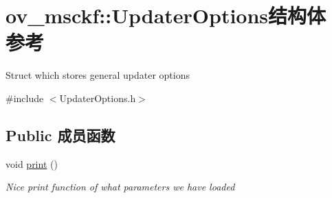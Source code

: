 \hypertarget{structov__msckf_1_1UpdaterOptions}{}\section{ov\+\_\+msckf\+:\+:Updater\+Options结构体 参考}
\label{structov__msckf_1_1UpdaterOptions}


Struct which stores general updater options  




{\ttfamily \#include $<$Updater\+Options.\+h$>$}

\subsection*{Public 成员函数}
\begin{DoxyCompactItemize}
\item 
\mbox{\label{structov__msckf_1_1UpdaterOptions_a0c5cea150bb07df959675b652a55ecd6}} 
void \hyperlink{structov__msckf_1_1UpdaterOptions_a0c5cea150bb07df959675b652a55ecd6}{print} ()
\begin{DoxyCompactList}\small\item\em Nice print function of what parameters we have loaded \end{DoxyCompactList}\end{DoxyCompactItemize}
